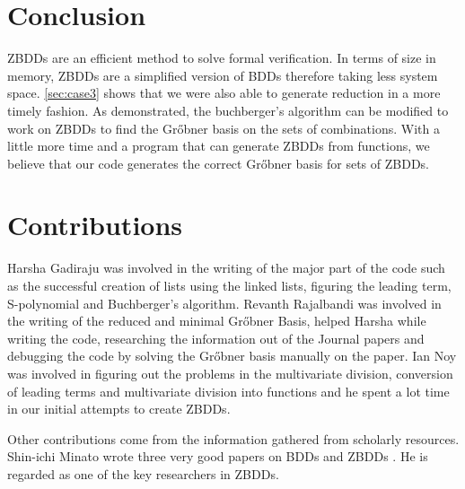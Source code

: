 \documentclass[letterpaper, 10 pt, conference]{ieeeconf}
\begin{document}
\section{Conclusion}
\label{sec:conc}
ZBDDs are an efficient method to solve formal verification.  In terms of size in memory, ZBDDs are a  simplified version of BDDs therefore taking less system space.  \ref{sec:case3} shows that we were also able to generate reduction in a more timely fashion.  As demonstrated, the buchberger's algorithm can be modified to work on ZBDDs to find the Gr{\H o}bner basis on the sets of combinations.  With a little more time and a program that can generate ZBDDs from functions, we believe that our code generates the correct Gr{\H o}bner basis for sets of ZBDDs.    

\section{Contributions}
\label{sec:cont}
Harsha Gadiraju was involved in the writing of the major part of the code such as the successful creation of lists using the linked lists, figuring the leading term, S-polynomial and Buchberger’s algorithm. Revanth Rajalbandi was involved in the writing of the reduced and minimal Gr{\H o}bner Basis, helped Harsha while writing the code, researching the information out of the Journal papers and debugging the code by solving the Gr{\H o}bner basis manually on the paper. Ian Noy was involved in figuring out the problems in the multivariate division, conversion of leading terms and multivariate division into functions and he spent a lot time in our initial attempts to create ZBDDs.

Other contributions come from the information gathered from scholarly resources. Shin-ichi Minato wrote three very good papers on BDDs and ZBDDs \cite{minato2001zero,minato1993zero,minato1996binary}.  He is regarded as one of the key researchers in ZBDDs. 



\end{document}
